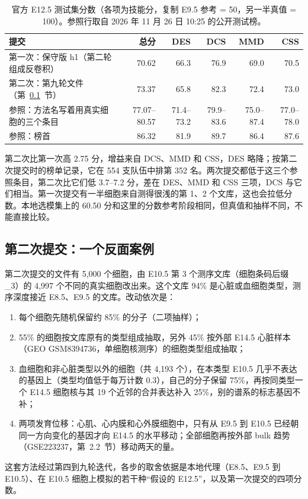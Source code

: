 \documentclass[UTF8,zihao=-4,fontset=none,a4paper]{ctexart}
\newcommand{\smalltable}{\small\renewcommand{\arraystretch}{1.2}}
\begin{document}
\begin{table}[h]
\centering\smalltable
\caption{官方 E12.5 测试集分数（各项为技能分，复制 E9.5 参考 = 50，另一半真值 = 100）。参照行取自 2026 年 11 月 26 日 10:25 的公开测试榜\cite{leaderboard}。}\label{tab:test}
\begin{tabularx}{\linewidth}{@{}Yrrrrr@{}}
\toprule
提交 & 总分 & DES & DCS & MMD & CSS\\
\midrule
第一次：保守版 h1（第二轮组成反卷积） & 70.62 & 66.3 & 76.9 & 69.0 & 70.5\\
第二次：第九轮文件（第~\ref{sec:negative}~节） & 73.37 & 65.8 & 82.3 & 72.4 & 73.0\\
\midrule
参照：方法名写着用真实细胞的三个条目 & 77.07--80.57 & 71.4--73.2 & 79.9--83.6 & 75.0--87.4 & 77.0--78.0\\
参照：榜首 & 86.32 & 81.9 & 89.7 & 86.4 & 87.6\\
\bottomrule
\end{tabularx}
\end{table}

第二次比第一次高 2.75 分，增益来自 DCS、MMD 和 CSS，DES 略降；按第二次提交时的榜单记录，它在 554 支队伍中排第 352 名。两次提交都低于这三个参照条目，第二次比它们低 3.7--7.2 分，差在 DES、MMD 和 CSS 三项，DCS 与它们相当。第一次提交有一半细胞来自测得很浅的第 1、2 个文库，这也会拉低分数。本地选模集上的 60.50 分和这里的分数参考阶段相同，但真值和抽样不同，不能直接比较。

\subsection{第二次提交：一个反面案例}\label{sec:negative}

第二次提交的文件有 5,000 个细胞，由 E10.5 第 3 个测序文库（细胞条码后缀 \_3）的 4,997 个不同的真实细胞改出来。这个文库 94\% 是心脏或血细胞类型，测序深度接近 E8.5、E9.5 的文库。改动依次是：
\begin{enumerate}[label=(\arabic*)]
  \item 每个细胞先随机保留约 85\% 的分子（二项抽样）；
  \item 55\% 的细胞按文库原有的类型组成抽取，另外 45\% 按外部 E14.5 心脏样本（GEO GSM8394736\cite{gsm8394736}，单细胞核测序）的细胞类型组成抽取；
  \item 血细胞和非心脏类型以外的细胞（共 4,193 个），在本类型 E10.5 几乎不表达的基因上（类型均值低于每万计数 0.3），自己的分子保留 75\%，再按同类型一个 E14.5 细胞核与其 19 个近邻的合并表达补入 25\%，别的谱系的标志基因不补；
  \item 两项发育位移：心肌、心内膜和心外膜细胞中，只有从 E9.5 到 E10.5 已经朝同一方向变化的基因才向 E14.5 的水平移动；全部细胞再按外部 bulk 趋势（GSE223237\cite{gse223237}，第~2.2~节）移动两天的量。
\end{enumerate}
这套方法经过第四到九轮迭代，各步的取舍依据是本地代理（E8.5、E9.5 到 E10.5）、在 E10.5 细胞上模拟的若干种“假设的 E12.5”，以及第一次提交的四项分数。
\end{document}
